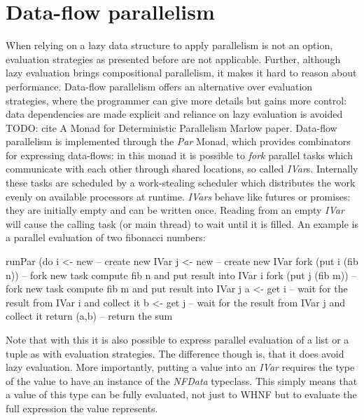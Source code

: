 \section{Data-flow parallelism}
When relying on a lazy data structure to apply parallelism is not an option, evaluation strategies as presented before are not applicable. Further, although lazy evaluation brings compositional parallelism, it makes it hard to reason about performance. Data-flow parallelism offers an alternative over evaluation strategies, where the programmer can give more details but gains more control: data dependencies are made explicit and reliance on lazy evaluation is avoided TODO: cite A Monad for Deterministic Parallelism Marlow paper.
Data-flow parallelism is implemented through the \textit{Par} Monad, which provides combinators for expressing data-flows: in this monad it is possible to \textit{fork} parallel tasks which communicate with each other through shared locations, so called \textit{IVar}s. Internally these tasks are scheduled by a work-stealing scheduler which distributes the work evenly on available processors at runtime. \textit{IVars} behave like futures or promises: they are initially empty and can be written once. Reading from an empty \textit{IVar} will cause the calling task (or main thread) to wait until it is filled. An example is a parallel evaluation of two fibonacci numbers:

\begin{HaskellCode}
runPar (do
  i <- new             -- create new IVar
  j <- new             -- create new IVar
  fork (put i (fib n)) -- fork new task compute fib n and put result into IVar i
  fork (put j (fib m)) -- fork new task compute fib m and put result into IVar j
  a <- get i           -- wait for the result from IVar i and collect it
  b <- get j           -- wait for the result from IVar j and collect it
  return (a,b)         -- return the sum
\end{HaskellCode}

Note that with this it is also possible to express parallel evaluation of a list or a tuple as with evaluation strategies. The difference though is, that it does avoid lazy evaluation. More importantly, putting a value into an \textit{IVar} requires the type of the value to have an instance of the \textit{NFData} typeclass. This simply means that a value of this type can be fully evaluated, not just to WHNF but to evaluate the full expression the value represents.

